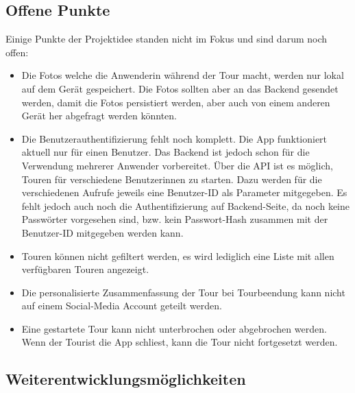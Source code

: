 \subsection{Offene Punkte}\label{offenePunkte}
Einige Punkte der Projektidee standen nicht im Fokus und sind darum noch offen:

\begin{itemize}
  \item Die Fotos welche die Anwenderin während der Tour macht, werden nur lokal auf dem Gerät gespeichert. Die Fotos sollten aber an das Backend gesendet werden, damit die Fotos persistiert werden, aber auch von einem anderen Gerät her abgefragt werden könnten.
  \item Die Benutzerauthentifizierung fehlt noch komplett. Die App funktioniert aktuell nur für einen Benutzer. Das Backend ist jedoch schon für die Verwendung mehrerer Anwender vorbereitet. Über die API ist es möglich, Touren für verschiedene Benutzerinnen zu starten. Dazu werden für die verschiedenen Aufrufe jeweils eine Benutzer-ID als Parameter mitgegeben. Es fehlt jedoch auch noch die Authentifizierung auf Backend-Seite, da noch keine Passwörter vorgesehen sind, bzw. kein Passwort-Hash zusammen mit der Benutzer-ID mitgegeben werden kann.
  \item Touren können nicht gefiltert werden, es wird lediglich eine Liste mit allen verfügbaren Touren angezeigt.
  \item Die personalisierte Zusammenfassung der Tour bei Tourbeendung kann nicht auf einem Social-Media Account geteilt werden.
  \item Eine gestartete Tour kann nicht unterbrochen oder abgebrochen werden. Wenn der Tourist die App schliest, kann die Tour nicht fortgesetzt werden.
\end{itemize}


\subsection{Weiterentwicklungsmöglichkeiten}\label{weiterentwicklungsmöglichkeiten}

